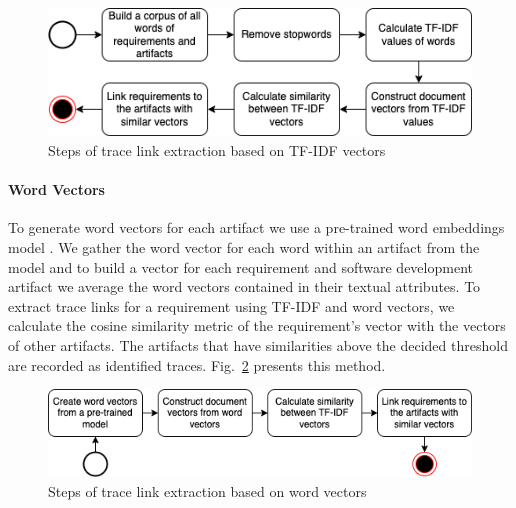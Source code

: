       \begin{figure}[htb]
        \centering
        \includegraphics[width=0.99\linewidth]{figs/tfidfvector2.png}
        \caption{Steps of trace link extraction based on TF-IDF vectors}
        \label{fig:tfidfvec}
      \end{figure}

      \paragraph{Word Vectors} To generate word vectors for each artifact we use a pre-trained word embeddings model . We gather the word vector for each word within an artifact from the model and to build a vector for each requirement and software development artifact we average the word vectors contained in their textual attributes. To extract trace links for a requirement using TF-IDF and word vectors, we calculate the cosine similarity metric of the requirement's vector with the vectors of other artifacts. The artifacts that have similarities above the decided threshold are recorded as identified traces. Fig.~\ref{fig:wordvec} presents this method.

       \begin{figure}[htb]
        \centering
        \includegraphics[width=0.99\linewidth]{figs/wordvector.png}
        \caption{Steps of trace link extraction based on word vectors}
        \label{fig:wordvec}
      \end{figure}








